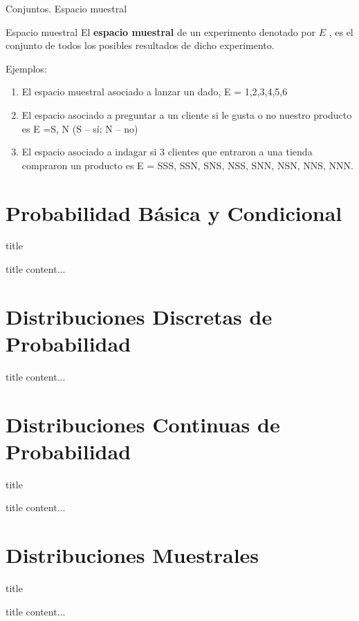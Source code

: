 \documentclass[11pt]{beamer}
\begin{document}
      \begin{frame}{Conjuntos. Espacio muestral}
          \begin{block}{Espacio muestral}
              El \textbf{espacio muestral} de un experimento denotado por $E$ , es el conjunto de todos los posibles resultados de dicho experimento.
          \end{block}
          Ejemplos:
          \begin{enumerate}[<+->]
              \item El espacio muestral asociado a lanzar un dado, E = {1,2,3,4,5,6}
              \item El espacio asociado a preguntar a un cliente si le gusta o no nuestro producto es E ={S, N} (S – sí; N – no)
              \item El espacio asociado a indagar si 3 clientes que entraron a una tienda compraron un producto es E = {SSS, SSN, SNS, NSS, SNN, NSN, NNS, NNN}.
          \end{enumerate}
      \end{frame}


    \section*{Probabilidad Básica y Condicional}
      \begin{frame}{title}
        \begin{block}{title}
            content...
        \end{block}
      \end{frame}

    \section*{Distribuciones Discretas de Probabilidad}
    \begin{frame}{title}
        content...
    \end{frame}



    \section*{Distribuciones Continuas de Probabilidad}
    \begin{frame}{title}
        \begin{block}{title}
            content...
        \end{block}
    \end{frame}



    \section*{Distribuciones Muestrales}
    \begin{frame}{title}
        \begin{block}{title}
            content...
        \end{block}
    \end{frame}
\end{document}
